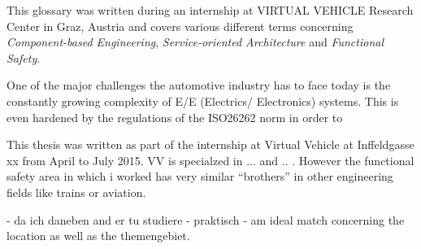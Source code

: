 This glossary was written during an internship at VIRTUAL VEHICLE Research Center in Graz, Austria and covers various different terms concerning \emph{Component-based Engineering}, \emph{Service-oriented Architecture} and \emph{Functional Safety}.

One of the major challenges the automotive industry has to face today is the constantly growing complexity of E/E (Electrics/ Electronics) systems. This is even hardened by the regulations of the ISO26262 norm in order to 

This thesis was written as part of the internship at Virtual Vehicle at Inffeldgasse xx from April to July 2015. VV is specialzed in ... and .. . However the functional safety area in which i worked has very similar ``brothers'' in other engineering fields like trains or aviation. 

- da ich daneben and er tu studiere - praktisch
- am ideal match concerning the location as well as the themengebiet.

